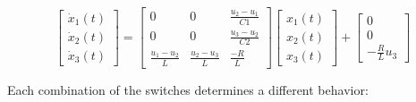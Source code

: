 \noindent
\begin{equation}
    \left[ \begin{array}{c}
        \dot{x}_1(t) \\
        \dot{x}_2(t) \\
        \dot{x}_3(t)
    \end{array} \right]
    =
    \left[ \begin{array}{ccc}
        0 & 0 & \frac{u_2 - u_1}{C1} \\
        0 & 0 & \frac{u_3 - u_2}{C2} \\
        \frac{u_1-u_2}{L} & \frac{u_2-u_3}{L} & \frac{-R}{L}
    \end{array} \right]
    \left[ \begin{array}{c}
        x_1(t) \\
        x_2(t) \\
        x_3(t)
    \end{array} \right]
    +
    \left[ \begin{array}{c}
        0 \\
        0 \\
        -\frac{R}{L}u_3
    \end{array} \right]
\end{equation}

Each combination of the switches determines a different behavior:


